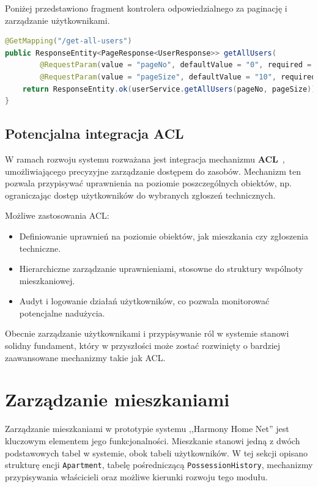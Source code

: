 \noindent Poniżej przedstawiono fragment kontrolera odpowiedzialnego za paginację i zarządzanie użytkownikami.
\begin{lstlisting}[language=Java, style=JavaStyle, caption=Metoda paginacji w \texttt{UserController}]
@GetMapping("/get-all-users")
public ResponseEntity<PageResponse<UserResponse>> getAllUsers(
        @RequestParam(value = "pageNo", defaultValue = "0", required = false) int pageNo,
        @RequestParam(value = "pageSize", defaultValue = "10", required = false) int pageSize) {
    return ResponseEntity.ok(userService.getAllUsers(pageNo, pageSize));
}
\end{lstlisting}

\subsection{Potencjalna integracja ACL}

W ramach rozwoju systemu rozważana jest integracja mechanizmu \textbf{ACL}~\cite{acl}, umożliwiającego precyzyjne zarządzanie dostępem do zasobów. Mechanizm ten pozwala przypisywać uprawnienia na poziomie poszczególnych obiektów, np. ograniczając dostęp użytkowników do wybranych zgłoszeń technicznych.

\noindent Możliwe zastosowania ACL:
\begin{itemize}
    \item Definiowanie uprawnień na poziomie obiektów, jak mieszkania czy zgłoszenia techniczne.
    \item Hierarchiczne zarządzanie uprawnieniami, stosowne do struktury wspólnoty mieszkaniowej.
    \item Audyt i logowanie działań użytkowników, co pozwala monitorować potencjalne nadużycia.
\end{itemize}

Obecnie zarządzanie użytkownikami i przypisywanie ról w systemie stanowi solidny fundament, który w przyszłości może zostać rozwinięty o bardziej zaawansowane mechanizmy takie jak ACL.

\section{Zarządzanie mieszkaniami}

Zarządzanie mieszkaniami w prototypie systemu ,,Harmony Home Net'' jest kluczowym elementem jego funkcjonalności. Mieszkanie stanowi jedną z dwóch podstawowych tabel w systemie, obok tabeli użytkowników. W tej sekcji opisano strukturę encji \texttt{Apartment}, tabelę pośredniczącą \texttt{PossessionHistory}, mechanizmy przypisywania właścicieli oraz możliwe kierunki rozwoju tego modułu.

